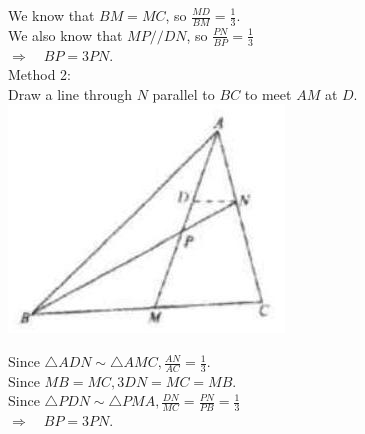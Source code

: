 \documentclass{article}
\begin{document}
We know that \(B M=M C\), so \(\frac{M D}{B M}=\frac{1}{3}\).\\
We also know that \(M P / / D N\), so \(\frac{P N}{B P}=\frac{1}{3}\)\\
\(\Rightarrow \quad B P=3 P N\).\\
Method 2:\\
Draw a line through \(N\) parallel to \(B C\) to meet \(A M\) at \(D\).\\
\centering
\includegraphics[width=\textwidth]{images/139(2).jpg}

Since \(\triangle A D N \sim \triangle A M C, \frac{A N}{A C}=\frac{1}{3}\).\\
Since \(M B=M C, 3 D N=M C=M B\).\\
Since \(\triangle P D N \sim \triangle P M A, \frac{D N}{M C}=\frac{P N}{P B}=\frac{1}{3}\)\\
\(\Rightarrow \quad B P=3 P N\).
\end{document}
